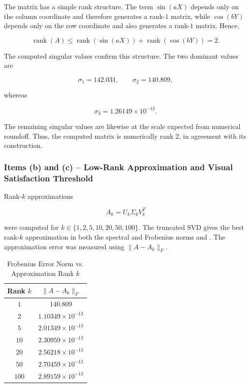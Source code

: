 The matrix has a simple rank structure. The term $\sin(aX)$ depends only on the column coordinate and therefore generates a rank-$1$ matrix, while $\cos(bY)$ depends only on the row coordinate and also generates a rank-$1$ matrix. Hence,

\begin{equation}
    \operatorname{rank}(A)
    \leq
    \operatorname{rank}(\sin(aX))
    +
    \operatorname{rank}(\cos(bY))
    =2.
\end{equation}

The computed singular values confirm this structure. The two dominant values are

\begin{equation}
    \sigma_1=142.031,
    \qquad
    \sigma_2=140.809,
\end{equation}

whereas

\begin{equation}
    \sigma_3=1.26149\times10^{-13}.
\end{equation}

The remaining singular values are likewise at the scale expected from numerical roundoff. Thus, the computed matrix is numerically rank $2$, in agreement with its construction.

\subsubsection*{Items (b) and (c) -- Low-Rank Approximation and Visual Satisfaction Threshold}

Rank-$k$ approximations

\begin{equation}
    A_k=U_k\Sigma_kV_k^T
\end{equation}

were computed for $k\in\{1,2,5,10,20,50,100\}$. The truncated SVD gives the best rank-$k$ approximation in both the spectral and Frobenius norms \cite[Lecture 5]{trefethen1997numerical} and \cite[Section 2.4]{golub2013matrix}. The approximation error was measured using $\|A-A_k\|_F$.

\begin{table}[H]
\centering
\caption{Frobenius Error Norm vs. Approximation Rank $k$}
\label{tab:error_k}
\begin{tabular}{cc}
\toprule
\textbf{Rank $k$} & \textbf{$\|A-A_k\|_F$} \\
\midrule
$1$   & $140.809$ \\
$2$   & $1.10349\times10^{-13}$ \\
$5$   & $2.01349\times10^{-13}$ \\
$10$  & $2.30959\times10^{-13}$ \\
$20$  & $2.56218\times10^{-13}$ \\
$50$  & $2.70459\times10^{-13}$ \\
$100$ & $2.89159\times10^{-13}$ \\
\bottomrule
\end{tabular}
\end{table}

